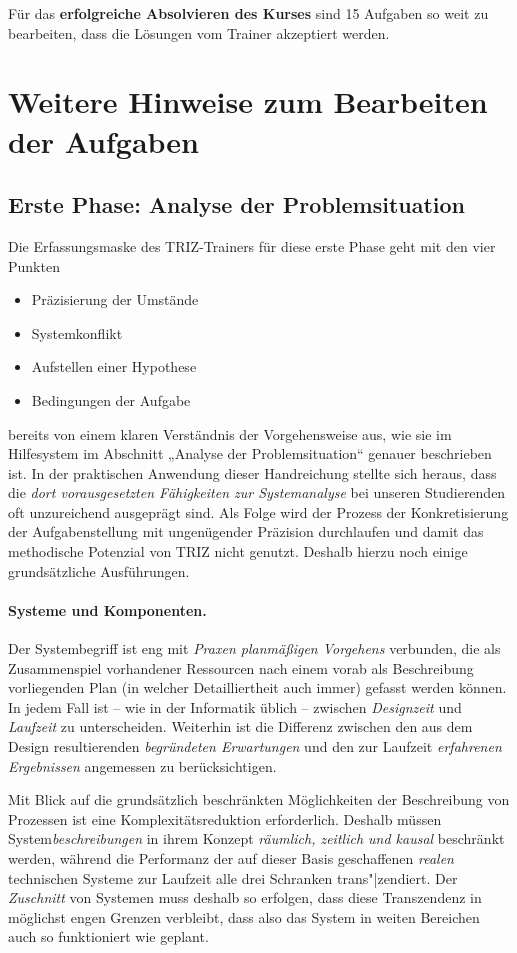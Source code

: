\documentclass[11pt,a4paper]{article}
\begin{document}
Für das \textbf{erfolgreiche Absolvieren des Kurses} sind 15 Aufgaben so weit
zu bearbeiten, dass die Lösungen vom Trainer akzeptiert werden.

\section{Weitere Hinweise zum Bearbeiten der Aufgaben}

\subsection{Erste Phase: Analyse der Problemsituation}

Die Erfassungsmaske des TRIZ-Trainers für diese erste Phase geht mit den vier
Punkten
\begin{itemize}\itemsep0pt
\item Präzisierung der Umstände 
\item Systemkonflikt
\item Aufstellen einer Hypothese 
\item Bedingungen der Aufgabe 
\end{itemize}
bereits von einem klaren Verständnis der Vorgehensweise aus, wie sie im
Hilfesystem im Abschnitt „Analyse der Problemsituation“ genauer beschrieben
ist.  In der praktischen Anwendung dieser Handreichung stellte sich heraus,
dass die \emph{dort vorausgesetzten Fähigkeiten zur Systemanalyse} bei unseren
Studierenden oft unzureichend ausgeprägt sind.  Als Folge wird der Prozess der
Konkretisierung der Aufgabenstellung mit ungenügender Präzision durchlaufen
und damit das methodische Potenzial von TRIZ nicht genutzt.  Deshalb hierzu
noch einige grundsätzliche Ausführungen.

\paragraph{Systeme und Komponenten.} 
Der Systembegriff ist eng mit \emph{Praxen planmäßigen Vorgehens} verbunden,
die als Zusammenspiel vorhandener Ressourcen nach einem vorab als Beschreibung
vorliegenden Plan (in welcher Detailliertheit auch immer) gefasst werden
können.  In jedem Fall ist -- wie in der Informatik üblich -- zwischen
\emph{Designzeit} und \emph{Laufzeit} zu unterscheiden. Weiterhin ist die
Differenz zwischen den aus dem Design resultierenden \emph{begründeten
  Erwartungen} und den zur Laufzeit \emph{erfahrenen Ergebnissen} angemessen
zu berücksichtigen.

Mit Blick auf die grundsätzlich beschränkten Möglichkeiten der Beschreibung
von Prozessen ist eine Komplexitätsreduktion erforderlich. Deshalb müssen
System\emph{beschreibungen} in ihrem Konzept \emph{räumlich, zeitlich und
  kausal} beschränkt werden, während die Performanz der auf dieser Basis
geschaffenen \emph{realen} technischen Systeme zur Laufzeit alle drei
Schranken trans"|zendiert. Der \emph{Zuschnitt} von Systemen muss deshalb so
erfolgen, dass diese Transzendenz in möglichst engen Grenzen verbleibt, dass
also das System in weiten Bereichen auch so funktioniert wie geplant.
\end{document}
